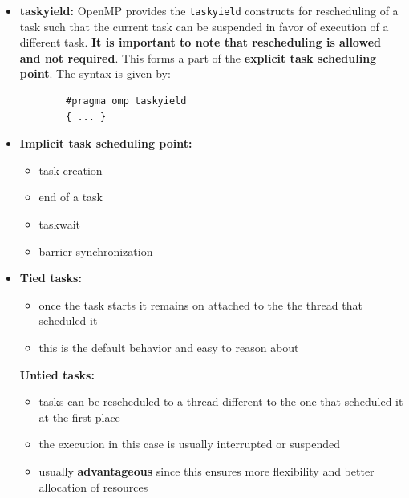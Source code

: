 \documentclass[12pt, a4paper]{report}
\begin{document}
\begin{itemize}
\begin{verbatim}
                #pragma omp task
                printf("Hello again!\n");
            }
        }
    \end{verbatim}
    \item {\bfseries{taskyield:}} OpenMP provides the \verb$taskyield$ constructs for rescheduling of a task such that the current task can be suspended in
          favor of execution of a different task. {\bfseries{It is important to note that rescheduling is allowed and not required}}. This forms a part of the
          {\bfseries{explicit task scheduling point}}. The syntax is given by:
    \begin{verbatim}
        #pragma omp taskyield
        { ... }
    \end{verbatim}
    \item {\bfseries{Implicit task scheduling point:}}
    \begin{itemize}
        \item task creation
        \item end of a task
        \item taskwait
        \item barrier synchronization
    \end{itemize}
    \item {\bfseries{Tied tasks:}}
    \begin{itemize}
        \item once the task starts it remains on attached to the the thread that scheduled it
        \item this is the default behavior and easy to reason about
    \end{itemize}
    {\bfseries{Untied tasks:}}
    \begin{itemize}
        \item tasks can be rescheduled to a thread different to the one that scheduled it at the first place
        \item the execution in this case is usually interrupted or suspended
        \item usually {\bfseries{advantageous}} since this ensures more flexibility and better allocation of resources
    \end{itemize}
\end{itemize}
\end{document}
